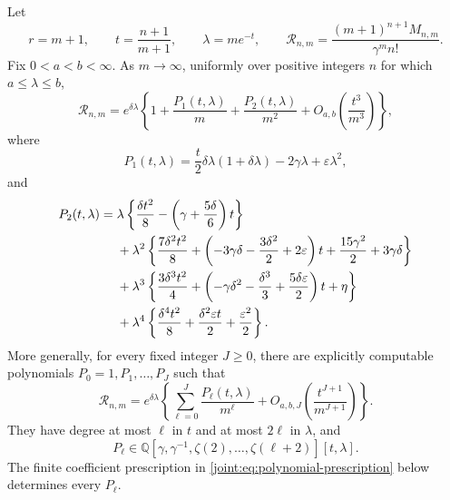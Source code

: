 \begin{theorem}\label{joint:thm:transition}
Let
\[
 r=m+1,\qquad t=\frac{n+1}{m+1},\qquad
 \lambda=me^{-t},\qquad
 \mathcal R_{n,m}=\frac{(m+1)^{n+1}M_{n,m}}{\gamma^m n!}.
\]
Fix $0<a<b<\infty$. As $m\to\infty$, uniformly over positive
integers $n$ for which $a\leq\lambda\leq b$,
\begin{equation}\label{joint:eq:two-corrections}
 \mathcal R_{n,m}
 =e^{\delta\lambda}
 \left\{1+\frac{P_1(t,\lambda)}m
          +\frac{P_2(t,\lambda)}{m^2}
          +O_{a,b}\left(\frac{t^3}{m^3}\right)\right\},
\end{equation}
where
\begin{equation}\label{joint:eq:P1}
 P_1(t,\lambda)=\frac{t}{2}\delta\lambda(1+\delta\lambda)
                      -2\gamma\lambda+\varepsilon\lambda^2,
\end{equation}
and
\begin{align}
 P_2(t,\lambda)={}&
 \lambda\left\{\frac{\delta t^2}{8}
                    -\left(\gamma+\frac{5\delta}{6}\right)t\right\}
 \notag\\
 &+\lambda^2\left\{\frac{7\delta^2t^2}{8}
        +\left(-3\gamma\delta-\frac{3\delta^2}{2}
                        +2\varepsilon\right)t
        +\frac{15\gamma^2}{2}+3\gamma\delta\right\}\notag\\
 &+\lambda^3\left\{\frac{3\delta^3t^2}{4}
        +\left(-\gamma\delta^2-\frac{\delta^3}{3}
                           +\frac{5\delta\varepsilon}{2}\right)t
        +\eta\right\}\notag\\
 &+\lambda^4\left\{\frac{\delta^4t^2}{8}
                    +\frac{\delta^2\varepsilon t}{2}
                    +\frac{\varepsilon^2}{2}\right\}.
 \label{joint:eq:P2}
\end{align}
More generally, for every fixed integer $J\geq0$, there are explicitly
computable polynomials $P_0=1,P_1,\ldots,P_J$ such that
\begin{equation}\label{joint:eq:all-orders}
 \mathcal R_{n,m}=e^{\delta\lambda}
 \left\{\sum_{\ell=0}^J\frac{P_\ell(t,\lambda)}{m^\ell}
       +O_{a,b,J}\left(\frac{t^{J+1}}{m^{J+1}}\right)\right\}.
\end{equation}
They have degree at most $\ell$ in $t$ and at most $2\ell$ in
$\lambda$, and
\[
 P_\ell\in
 \mathbb Q[\gamma,\gamma^{-1},\zeta(2),\ldots,\zeta(\ell+2)]
 [t,\lambda].
\]
The finite coefficient prescription in
\eqref{joint:eq:polynomial-prescription} below determines every
$P_\ell$.
\end{theorem}

